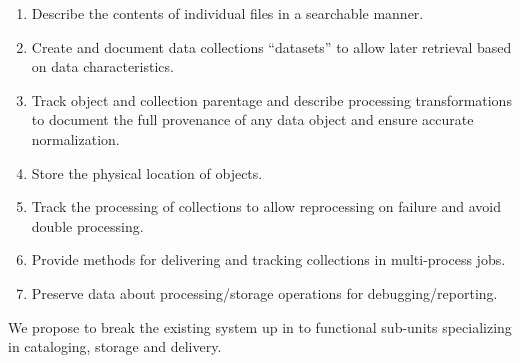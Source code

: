 \documentclass[../main-v1.tex]{subfiles}
\begin{document}
\begin{enumerate}

\item	Describe the contents of individual files in a searchable manner. 

\item	Create and document data collections ``datasets'' to allow later retrieval based on data characteristics.

 \item	Track object and collection parentage and describe processing transformations to document the full provenance of any data object and ensure accurate normalization.


 \item	Store the physical  location of objects.

 \item	Track the processing of collections to allow reprocessing on failure and avoid double processing.

 \item	Provide methods for delivering and tracking collections in multi-process jobs.

 \item	Preserve data about processing/storage operations for debugging/reporting.

\end{enumerate}
 We propose to break the existing system up in to functional sub-units specializing in cataloging, storage and delivery. 
\end{document}
